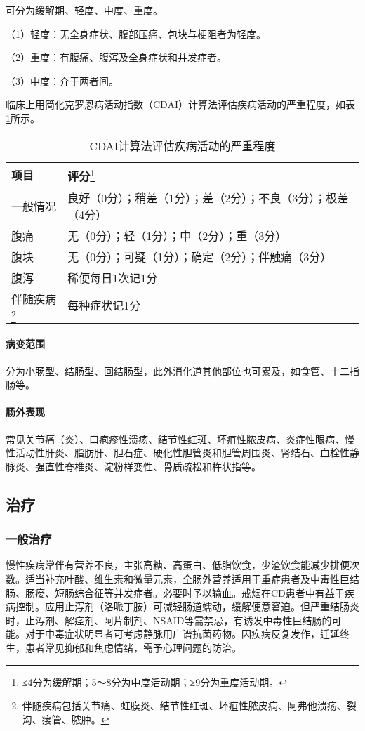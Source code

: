 可分为缓解期、轻度、中度、重度。

（1）轻度：无全身症状、腹部压痛、包块与梗阻者为轻度。

（2）重度：有腹痛、腹泻及全身症状和并发症者。

（3）中度：介于两者间。

临床上用简化克罗恩病活动指数（CDAI）计算法评估疾病活动的严重程度，如表\ref{tab13-4}所示。

\begin{longtable}[]{@{}ll@{}}
    \caption{CDAI计算法评估疾病活动的严重程度}
    \label{tab13-4}\\
    \toprule
    \endhead
    项目        & 评分\footnote{≤4分为缓解期；5～8分为中度活动期；≥9分为重度活动期。}\tabularnewline
    \midrule
    一般情况    &
    良好（0分）；稍差（1分）；差（2分）；不良（3分）；极差（4分）\tabularnewline
    腹痛        & 无（0分）；轻（1分）；中（2分）；重（3分）\tabularnewline
    腹块        & 无（0分）；可疑（1分）；确定（2分）；伴触痛（3分）\tabularnewline
    腹泻        & 稀便每日1次记1分\tabularnewline
    伴随疾病\footnote{伴随疾病包括关节痛、虹膜炎、结节性红斑、坏疽性脓皮病、阿弗他溃疡、裂沟、瘘管、脓肿。} & 每种症状记1分\tabularnewline
    \bottomrule
\end{longtable}

\paragraph{病变范围}

分为小肠型、结肠型、回结肠型，此外消化道其他部位也可累及，如食管、十二指肠等。
\paragraph{肠外表现}

常见关节痛（炎）、口疱疹性溃疡、结节性红斑、坏疽性脓皮病、炎症性眼病、慢性活动性肝炎、脂肪肝、胆石症、硬化性胆管炎和胆管周围炎、肾结石、血栓性静脉炎、强直性脊椎炎、淀粉样变性、骨质疏松和杵状指等。

\subsection{治疗}

\subsubsection{一般治疗}

慢性疾病常伴有营养不良，主张高糖、高蛋白、低脂饮食，少渣饮食能减少排便次数。适当补充叶酸、维生素和微量元素，全肠外营养适用于重症患者及中毒性巨结肠、肠瘘、短肠综合征等并发症者。必要时予以输血。戒烟在CD患者中有益于疾病控制。应用止泻剂（洛哌丁胺）可减轻肠道蠕动，缓解便意窘迫。但严重结肠炎时，止泻剂、解痉剂、阿片制剂、NSAID等需禁忌，有诱发中毒性巨结肠的可能。对于中毒症状明显者可考虑静脉用广谱抗菌药物。因疾病反复发作，迁延终生，患者常见抑郁和焦虑情绪，需予心理问题的防治。

